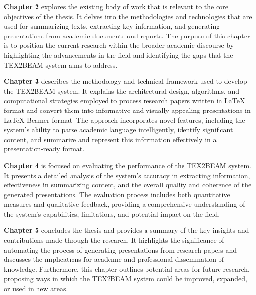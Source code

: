 \textbf{Chapter 2} explores the existing body of work that is relevant to the core objectives of the thesis. It delves into the methodologies and technologies that are used for summarizing texts, extracting key information, and generating presentations from academic documents and reports. The purpose of this chapter is to position the current research within the broader academic discourse by highlighting the advancements in the field and identifying the gaps that the TEX2BEAM system aims to address.

\textbf{Chapter 3} describes the methodology and technical framework used to develop the TEX2BEAM system. It explains the architectural design, algorithms, and computational strategies employed to process research papers written in \LaTeX{} format and convert them into informative and visually appealing presentations in \LaTeX{} Beamer format. The approach incorporates novel features, including the system's ability to parse academic language intelligently, identify significant content, and summarize and represent this information effectively in a presentation-ready format.

\textbf{Chapter 4} is focused on evaluating the performance of the TEX2BEAM system. It presents a detailed analysis of the system's accuracy in extracting information, effectiveness in summarizing content, and the overall quality and coherence of the generated presentations. The evaluation process includes both quantitative measures and qualitative feedback, providing a comprehensive understanding of the system's capabilities, limitations, and potential impact on the field.

\textbf{Chapter 5} concludes the thesis and provides a summary of the key insights and contributions made through the research. It highlights the significance of automating the process of generating presentations from research papers and discusses the implications for academic and professional dissemination of knowledge. Furthermore, this chapter outlines potential areas for future research, proposing ways in which the TEX2BEAM system could be improved, expanded, or used in new areas.
